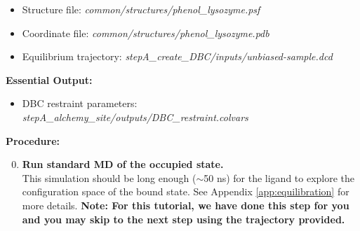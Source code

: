 \documentclass[9pt,tutorial]{Styling/livecoms}
\newcommand{\filepath}[1]{\textit{#1}}
\begin{document}
    \begin{itemize}
        \item Structure file: \filepath{common/structures/phenol\_lysozyme.psf} \item Coordinate file: \filepath{common/structures/phenol\_lysozyme.pdb}
        \item Equilibrium trajectory: \filepath{stepA\_create\_DBC/inputs/unbiased-sample.dcd}
    \end{itemize}
    \textbf{Essential Output:}
    \begin{itemize}
        \item DBC restraint parameters: \filepath{stepA\_alchemy\_site/outputs/DBC\_restraint.colvars}
    \end{itemize}
    \textbf{Procedure:}
    \begin{enumerate}
    \setcounter{enumi}{-1}
    \item \textbf{Run standard MD of the occupied state.}\label{step:unbiased}\\
    This simulation should be long enough ($\sim$50 ns) for the ligand to explore the configuration space of the bound state. See Appendix \ref{app:equilibration} for more details.
    \textbf{Note: For this tutorial, we have done this step for you and you may skip to the next step using the trajectory provided.}
    

\end{enumerate}
\end{document}
